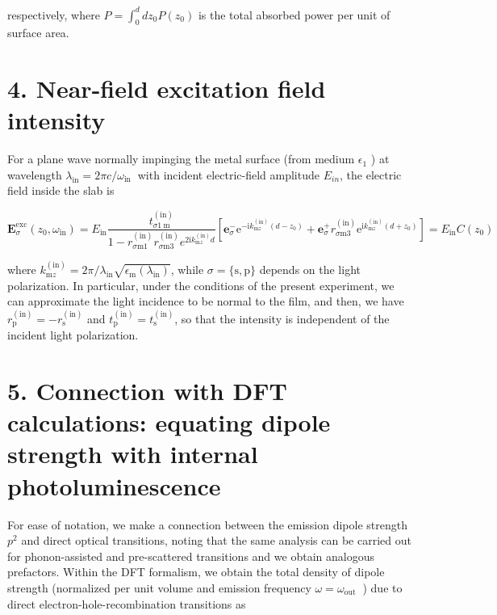 \documentclass[10pt]{article}
\begin{document}
respectively, where $P=\int_{0}^{d} d z_{0} P\left(z_{0}\right)$ is the total absorbed power per unit of surface area.

\section*{4. Near-field excitation field intensity}
For a plane wave normally impinging the metal surface (from medium $\epsilon_{1}$ ) at wavelength $\lambda_{\mathrm{in}}= 2 \pi c / \omega_{\text {in }}$ with incident electric-field amplitude $E_{i n}$, the electric field inside the slab is

$$
\mathbf{E}_{\sigma}^{\mathrm{exc}}\left(z_{0}, \omega_{\mathrm{in}}\right)=E_{\mathrm{in}} \frac{t_{\sigma 1 \mathrm{~m}}^{(\mathrm{in})}}{1-r_{\sigma \mathrm{m} 1}^{(\mathrm{in})} r_{\sigma \mathrm{m} 3}^{(\mathrm{in})} e^{2 \mathrm{i} k_{\mathrm{m} z}^{(\mathrm{in})} d}}\left[\mathbf{e}_{\sigma}^{-} \mathrm{e}^{-\mathrm{i} k_{\mathrm{m} z}^{(\mathrm{in})}\left(d-z_{0}\right)}+\mathbf{e}_{\sigma}^{+} r_{\sigma \mathrm{m} 3}^{(\mathrm{in})} \mathrm{e}^{\mathrm{i} k_{\mathrm{m} z}^{(\mathrm{in})}\left(d+z_{0}\right)}\right]=E_{\mathrm{in}} C\left(z_{0}\right)
$$

where $k_{\mathrm{m} z}^{(\mathrm{in})}=2 \pi / \lambda_{\mathrm{in}} \sqrt{\epsilon_{\mathrm{m}}\left(\lambda_{\mathrm{in}}\right)}$, while $\sigma=\{\mathrm{s}, \mathrm{p}\}$ depends on the light polarization. In particular, under the conditions of the present experiment, we can approximate the light incidence to be normal to the film, and then, we have $r_{\mathrm{p}}^{(\mathrm{in})}=-r_{\mathrm{s}}^{(\mathrm{in})}$ and $t_{\mathrm{p}}^{(\mathrm{in})}=t_{\mathrm{s}}^{(\mathrm{in})}$, so that the intensity is independent of the incident light polarization.

\section*{5. Connection with DFT calculations: equating dipole strength with internal photoluminescence}
For ease of notation, we make a connection between the emission dipole strength $p^{2}$ and direct optical transitions, noting that the same analysis can be carried out for phonon-assisted and pre-scattered transitions and we obtain analogous prefactors. Within the DFT formalism, we obtain the total density of dipole strength (normalized per unit volume and emission frequency $\omega=\omega_{\text {out }}$ ) due to direct electron-hole-recombination transitions as
\end{document}
